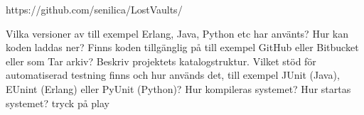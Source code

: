 \documentclass[a4paper]{article}
\begin{document}
https://github.com/senilica/LostVaults/

Vilka versioner av till exempel Erlang, Java, Python etc har använts?
Hur kan koden laddas ner? Finns koden tillgänglig på till exempel GitHub eller Bitbucket eller som Tar arkiv?  Beskriv projektets katalogstruktur.
Vilket stöd för automatiserad testning finns och hur används det, till exempel JUnit (Java), EUnint (Erlang) eller PyUnit (Python)?
Hur kompileras systemet?
Hur startas systemet? tryck på play
\end{document}
